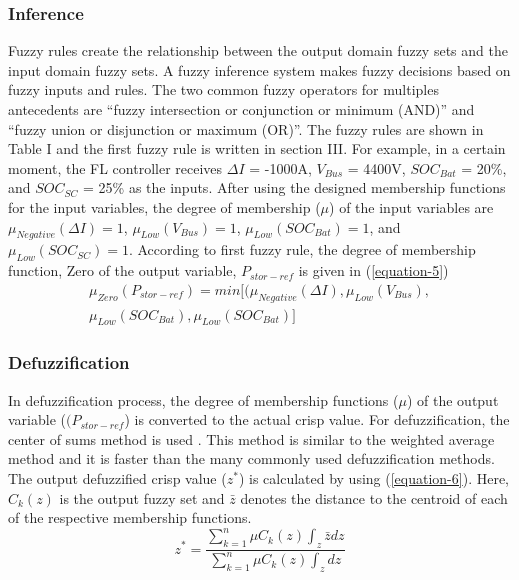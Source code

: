 \subsubsection{Inference}Fuzzy rules create the relationship between the output domain fuzzy sets and the input domain fuzzy sets. A fuzzy inference system makes fuzzy decisions based on fuzzy inputs and rules. The two common fuzzy operators for multiples antecedents are “fuzzy intersection or conjunction or minimum (AND)” and “fuzzy union or disjunction or maximum (OR)”. The fuzzy rules are shown in Table I and the first fuzzy rule is written in section III. For example, in a certain moment, the FL controller receives $\Delta I$ = -1000A, $V_{Bus}$ = 4400V, $SOC_{Bat}$ = 20\%, and $SOC_{SC}$ = 25\% as the inputs. After using the designed membership functions for the input variables, the degree of membership ($\mu$) of the input variables are  $\mu_{Negative}(\Delta I) = 1$, $\mu_{Low}(V_{Bus}) = 1$,  $\mu_{Low}(SOC_{Bat}) = 1$, and  $\mu_{Low}(SOC_{SC}) = 1$. According to first fuzzy rule, the degree of membership function, Zero of the output variable, $P_{stor-ref}$ is given in (\ref{equation-5})
\begin{multline}\label{equation-5}
\mu_{Zero}(P_{stor-ref})= min[(\mu_{Negative}(\Delta I), \mu_{Low}(V_{Bus}), \\
\mu_{Low}(SOC_{Bat}), \mu_{Low}(SOC_{Bat})]
\end{multline}
\subsubsection{Defuzzification} In defuzzification process, the degree of membership functions ($\mu$) of the output variable ($(P_{stor-ref}$) is converted to the actual crisp value. For defuzzification, the center of sums method is used \cite{ross2009fuzzy}. This method is similar to the weighted average method and it is faster than the many commonly used defuzzification methods. The output defuzzified crisp value ($z^{\ast}$) is calculated by using (\ref{equation-6}).  Here, $C_k(z)$ is the output fuzzy set and  $\bar{z}$ denotes the distance to the centroid of each of the respective membership functions. 
\begin{equation}\label{equation-6}
z^{\ast}=\frac{\sum_{k=1}^{n}\mu C_k(z)\int_z \bar{z} dz}{\sum_{k=1}^{n}\mu C_k(z)\int_z dz}
\end{equation}
